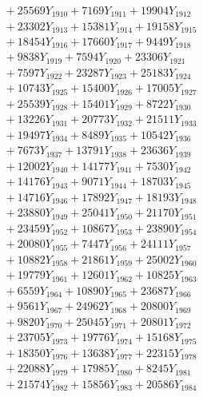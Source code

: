 \documentclass[a4paper,10pt]{article}
\begin{document}
{\begin{align}
&\;  + 25569 Y_{1910} + 7169 Y_{1911} + 19904 Y_{1912} \\[0.3ex]
&\;  + 23302 Y_{1913} + 15381 Y_{1914} + 19158 Y_{1915} \\[0.3ex]
&\;  + 18454 Y_{1916} + 17660 Y_{1917} + 9449 Y_{1918} \\[0.5ex]\allowbreak
&\;  + 9838 Y_{1919} + 7594 Y_{1920} + 23306 Y_{1921} \\[0.3ex]
&\;  + 7597 Y_{1922} + 23287 Y_{1923} + 25183 Y_{1924} \\[0.3ex]
&\;  + 10743 Y_{1925} + 15400 Y_{1926} + 17005 Y_{1927} \\[0.3ex]
&\;  + 25539 Y_{1928} + 15401 Y_{1929} + 8722 Y_{1930} \\[0.3ex]
&\;  + 13226 Y_{1931} + 20773 Y_{1932} + 21511 Y_{1933} \\[0.3ex]
&\;  + 19497 Y_{1934} + 8489 Y_{1935} + 10542 Y_{1936} \\[0.3ex]
&\;  + 7673 Y_{1937} + 13791 Y_{1938} + 23636 Y_{1939} \\[0.3ex]
&\;  + 12002 Y_{1940} + 14177 Y_{1941} + 7530 Y_{1942} \\[0.3ex]
&\;  + 14176 Y_{1943} + 9071 Y_{1944} + 18703 Y_{1945} \\[0.3ex]
&\;  + 14716 Y_{1946} + 17892 Y_{1947} + 18193 Y_{1948} \\[0.5ex]\allowbreak
&\;  + 23880 Y_{1949} + 25041 Y_{1950} + 21170 Y_{1951} \\[0.3ex]
&\;  + 23459 Y_{1952} + 10867 Y_{1953} + 23890 Y_{1954} \\[0.3ex]
&\;  + 20080 Y_{1955} + 7447 Y_{1956} + 24111 Y_{1957} \\[0.3ex]
&\;  + 10882 Y_{1958} + 21861 Y_{1959} + 25002 Y_{1960} \\[0.3ex]
&\;  + 19779 Y_{1961} + 12601 Y_{1962} + 10825 Y_{1963} \\[0.3ex]
&\;  + 6559 Y_{1964} + 10890 Y_{1965} + 23687 Y_{1966} \\[0.3ex]
&\;  + 9561 Y_{1967} + 24962 Y_{1968} + 20800 Y_{1969} \\[0.3ex]
&\;  + 9820 Y_{1970} + 25045 Y_{1971} + 20801 Y_{1972} \\[0.3ex]
&\;  + 23705 Y_{1973} + 19776 Y_{1974} + 15168 Y_{1975} \\[0.3ex]
&\;  + 18350 Y_{1976} + 13638 Y_{1977} + 22315 Y_{1978} \\[0.5ex]\allowbreak
&\;  + 22088 Y_{1979} + 17985 Y_{1980} + 8245 Y_{1981} \\[0.3ex]
&\;  + 21574 Y_{1982} + 15856 Y_{1983} + 20586 Y_{1984} \\[0.3ex]

\end{align}}
\end{document}
